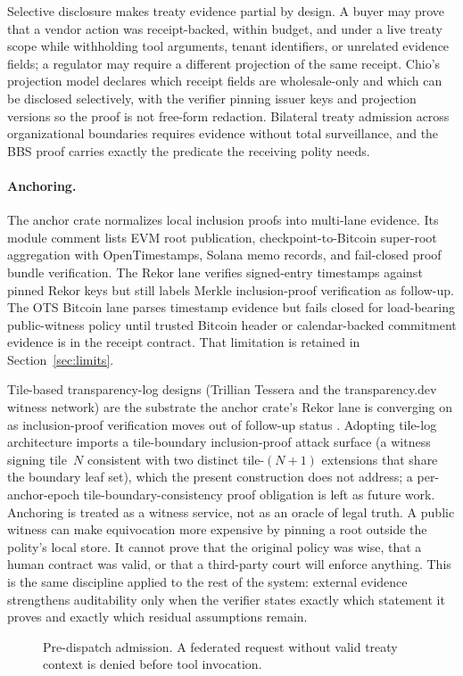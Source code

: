 Selective disclosure makes treaty evidence partial by design. A buyer may prove that a vendor action was receipt-backed, within budget, and under a live treaty scope while withholding tool arguments, tenant identifiers, or unrelated evidence fields; a regulator may require a different projection of the same receipt. Chio's projection model declares which receipt fields are wholesale-only and which can be disclosed selectively, with the verifier pinning issuer keys and projection versions so the proof is not free-form redaction. Bilateral treaty admission across organizational boundaries requires evidence without total surveillance, and the BBS proof carries exactly the predicate the receiving polity needs.

\paragraph{Anchoring.}
The anchor crate normalizes local inclusion proofs into multi-lane evidence. Its module comment lists EVM root publication, checkpoint-to-Bitcoin super-root aggregation with OpenTimestamps, Solana memo records, and fail-closed proof bundle verification. The Rekor lane verifies signed-entry timestamps against pinned Rekor keys but still labels Merkle inclusion-proof verification as follow-up. The OTS Bitcoin lane parses timestamp evidence but fails closed for load-bearing public-witness policy until trusted Bitcoin header or calendar-backed commitment evidence is in the receipt contract. That limitation is retained in Section~\ref{sec:limits}.

Tile-based transparency-log designs (Trillian Tessera and the transparency.dev witness network) are the substrate the anchor crate's Rekor lane is converging on as inclusion-proof verification moves out of follow-up status \cite{trillianTessera}. Adopting tile-log architecture imports a tile-boundary inclusion-proof attack surface (a witness signing tile~$N$ consistent with two distinct tile-$(N{+}1)$ extensions that share the boundary leaf set), which the present construction does not address; a per-anchor-epoch tile-boundary-consistency proof obligation is left as future work. Anchoring is treated as a witness service, not as an oracle of legal truth. A public witness can make equivocation more expensive by pinning a root outside the polity's local store. It cannot prove that the original policy was wise, that a human contract was valid, or that a third-party court will enforce anything. This is the same discipline applied to the rest of the system: external evidence strengthens auditability only when the verifier states exactly which statement it proves and exactly which residual assumptions remain.

\begin{figure}
  \centering
  \resizebox{\linewidth}{!}{}
  \caption{Pre-dispatch admission. A federated request without valid treaty context is denied before tool invocation.}
  \label{fig:admission}
\end{figure}
